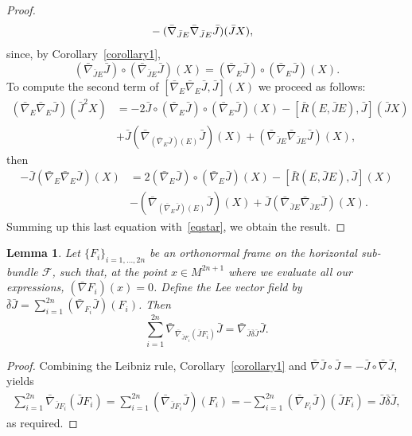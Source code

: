 \documentclass[a4paper,reqno]{amsart}
\newtheorem{lemma}[thm]{Lemma}
\theoremstyle{definition}
\theoremstyle{remark}
\theoremstyle{plain}
\numberwithin{equation}{section}
\newcommand{\f}{\mathcal{F}}
\begin{document}
\begin{proof}
\begin{align}
&-(\bar{\nabla}_{\bar{J}E}\bar{\nabla}_{\bar{J}E}\bar{J}) (\bar{J}X) ,\notag
\end{align}
since, by Corollary~\ref{corollary1},
$$(\bar{\nabla}_{\bar{J}E}\bar{J})\circ(\bar{\nabla}_{\bar{J}E}\bar{J})(X) =
(\bar{\nabla}_{E}\bar{J})\circ(\bar{\nabla}_{E}\bar{J})(X).$$ 
To compute the second term of $[\bar{\nabla}_E\bar{\nabla}_E \bar{J} ,
\bar{J}] (X)$ we proceed as follows: 
\begin{align*} 
(\bar{\nabla}_E \bar{\nabla}_E \bar{J})(\bar{J}^2X)&=-2\bar{J}\circ(\bar{\nabla}_{E}\bar{J})\circ(\bar{\nabla}_{E}\bar{J})(X)-[\bar{R}(E,\bar{J}E),\bar{J}](\bar{J}X)\\
&+\bar{J}(\bar{\nabla}_{(\bar{\nabla}_E\bar{J})(E)}\bar{J})(X)+(\bar{\nabla}_{\bar{J}E}\bar{\nabla}_{\bar{J}E}\bar{J}) (X),
\end{align*}
then
\begin{align*} 
-\bar{J}(\bar{\nabla}_E \bar{\nabla}_E \bar{J})(X)&=2(\bar{\nabla}_{E}\bar{J})\circ(\bar{\nabla}_{E}\bar{J})(X)-[\bar{R}(E,\bar{J}E),\bar{J}](X)\\
&-(\bar{\nabla}_{(\bar{\nabla}_E\bar{J})(E)}\bar{J})(X)+\bar{J}(\bar{\nabla}_{\bar{J}E}\bar{\nabla}_{\bar{J}E}\bar{J}) (X).
\end{align*}
Summing up this last equation with~\eqref{eqstar}, we obtain the result.
\end{proof}


\begin{lemma}\label{lemma3.3}
  Let $\{F_i\}_{i=1,\dots, 2n}$ be an orthonormal frame on the
  horizontal sub-bundle $\f$, such that, at the point
  $x\in M^{2n+1}$ where we evaluate all our expressions,
  $(\bar{\nabla} F_i)(x) =0$.  Define the Lee vector field by
  $\bar{\delta}\bar{J}=\sum_{i=1}^{2n}(\bar{\nabla}_{F_i}
  \bar{J})(F_i)$. Then
  $$
  \sum_{i=1}^{2n}\bar{\nabla}_{\bar{\nabla}_{\bar{J}F_i} (\bar{J}F_i)}\bar{J} =
  \bar{\nabla}_{\bar{J}\bar{\delta}\bar{J}}\bar{J} .
  $$
\end{lemma}

\begin{proof}
  Combining the Leibniz rule, Corollary~\ref{corollary1} and
  $\bar{\nabla} \bar{J} \circ \bar{J} =- \bar{J}\circ \bar{\nabla} \bar{J}$, yields
\begin{align*}
\sum_{i=1}^{2n}\bar{\nabla}_{\bar{J}F_i} (\bar{J}F_i) 
= \sum_{i=1}^{2n}(\bar{\nabla}_{\bar{J}F_i} \bar{J})(F_i) =- \sum_{i=1}^{2n}(\bar{\nabla}_{F_i} \bar{J})(\bar{J}F_i)= \bar{J}\bar{\delta}\bar{J} ,
\end{align*}
as required.
\end{proof}
\end{document}
